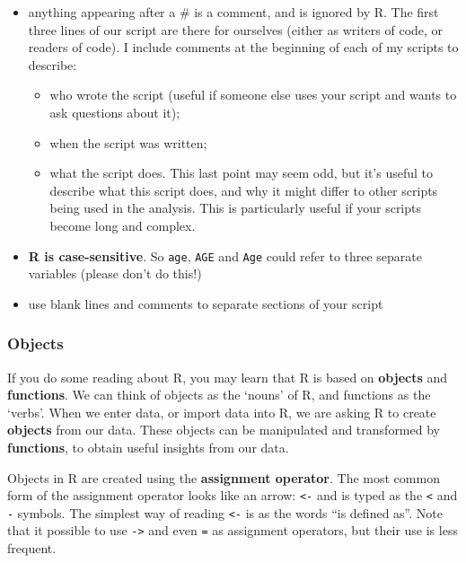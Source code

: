 \documentclass[
  a4paper,
]{memoir}
\begin{document}
\begin{itemize}
\item
  anything appearing after a \# is a comment, and is ignored by R. The
  first three lines of our script are there for ourselves (either as
  writers of code, or readers of code). I include comments at the
  beginning of each of my scripts to describe:

  \begin{itemize}
  \item
    who wrote the script (useful if someone else uses your script and
    wants to ask questions about it);
  \item
    when the script was written;
  \item
    what the script does. This last point may seem odd, but it's useful
    to describe what this script does, and why it might differ to other
    scripts being used in the analysis. This is particularly useful if
    your scripts become long and complex.
  \end{itemize}
\item
  \textbf{R is case-sensitive}. So \texttt{age}, \texttt{AGE} and
  \texttt{Age} could refer to three separate variables (please don't do
  this!)
\item
  use blank lines and comments to separate sections of your script
\end{itemize}

\subsubsection{Objects}\label{objects}

If you do some reading about R, you may learn that R is based on
\textbf{objects} and \textbf{functions}. We can think of objects as the
`nouns' of R, and functions as the `verbs'. When we enter data, or
import data into R, we are asking R to create \textbf{objects} from our
data. These objects can be manipulated and transformed by
\textbf{functions}, to obtain useful insights from our data.

Objects in R are created using the \textbf{assignment operator}. The
most common form of the assignment operator looks like an arrow:
\texttt{\textless{}-} and is typed as the \texttt{\textless{}} and
\texttt{-} symbols. The simplest way of reading \texttt{\textless{}-} is
as the words ``is defined as''. Note that it possible to use
\texttt{-\textgreater{}} and even \texttt{=} as assignment operators,
but their use is less frequent.
\end{document}
